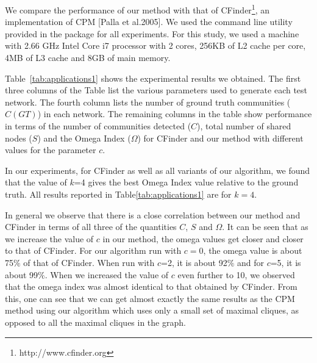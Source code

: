 We compare the performance of our method with that of CFinder\footnote{http://www.cfinder.org}, an implementation of CPM [Palla et al.2005]. We used the command line utility provided in the package for all experiments. For this study, we used a machine with 2.66 GHz Intel Core i7 processor with 2 cores, 256KB of L2 cache per core, 4MB of L3 cache and 8GB of main memory.




Table~\ref{tab:applications1} shows the experimental results we obtained.
The first three columns of the Table list the various parameters used to generate each test network. The fourth column lists the number of ground truth communities ($C(GT)$) in each network.  The remaining columns in the table show performance 
in terms of the number of communities detected ($C$), 
total number of shared nodes ($S$) and the Omega Index ($\Omega$) for 
CFinder and our method with different values for the parameter $c$.

In our experiments, for CFinder as well as all variants of our algorithm, 
we found that the value of $k$=4 gives the best Omega Index value relative 
to the ground truth. All results reported in Table\ref{tab:applications1} are for $k=4$.

In general we observe that there is a close correlation between our method and CFinder
in terms of all three of the quantities $C$, $S$ and $\Omega$. It can be seen that as we increase the value of $c$ in our method, the omega values get closer and closer to that of CFinder. For our algorithm run with $c=0$, the omega value is about 75$\%$ of that of CFinder. When run with $c$=2, it is about 92$\%$ and for $c$=5, it is about 99$\%$. When we increased the value of $c$ even further to 10, we observed that the omega index was almost identical to that obtained by CFinder. From this, one can see that we can get almost exactly the same results as the CPM method using our algorithm which uses only a small set of 
maximal cliques, as opposed to all the maximal cliques in the graph.



